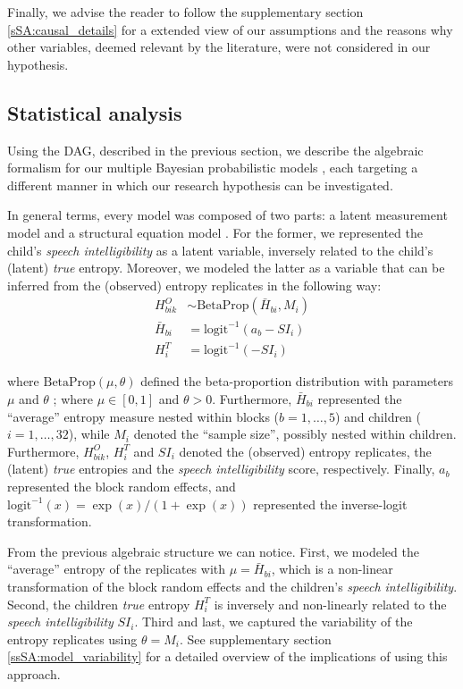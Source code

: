 Finally, we advise the reader to follow the supplementary section \ref{sSA:causal_details} for a extended view of our assumptions and the reasons why other variables, deemed relevant by the literature, were not considered in our hypothesis.
%
%
\subsection{Statistical analysis} \label{sS:stat_analysis}
%
Using the DAG, described in the previous section, we describe the algebraic formalism for our multiple Bayesian probabilistic models \cite{Jaynes_2003}, each targeting a different manner in which our research hypothesis can be investigated.

In general terms, every model was composed of two parts: a latent measurement model \cite{Everitt_1984} and a structural equation model \cite{Hoyle_et_al_2014}. For the former, we represented the child's \textit{speech intelligibility} as a latent variable, inversely related to the child's (latent) \textit{true} entropy. Moreover, we modeled the latter as a variable that can be inferred from the (observed) entropy replicates in the following way:
%
\begin{align}
	H^{O}_{bik} & \sim \text{BetaProp} \left( \bar{H}_{bi}, M_{i} \right) \\ 
	\bar{H}_{bi} &= \text{logit}^{-1}( a_{b} -SI_{i} ) \\
	H^{T}_{i} &= \text{logit}^{-1}( -SI_{i} )
\end{align} 

\noindent where $\text{BetaProp}(\mu, \theta)$ defined the beta-proportion distribution with parameters $\mu$ and $\theta$ \cite{Figueroa-Zuniga_et_al_2013, Kruschke_2015}; where $\mu \in [0,1]$ and $\theta>0$. Furthermore, $\bar{H}_{bi}$ represented the ``average'' entropy measure nested within blocks ($b=1,\dots,5$) and children ($i=1,\dots,32$), while $M_{i}$ denoted the ``sample size'', possibly nested within children. Furthermore, $H^{O}_{bik}$, $H^{T}_{i}$ and $SI_{i}$ denoted the (observed) entropy replicates, the (latent) \textit{true} entropies and the \textit{speech intelligibility} score, respectively. Finally, $a_{b}$ represented the block random effects, and $\text{logit}^{-1}(x) = \exp(x) / ( 1 + \exp(x) )$ represented the inverse-logit transformation. 

From the previous algebraic structure we can notice. First, we modeled the ``average'' entropy of the replicates with $\mu = \bar{H}_{bi}$, which is a non-linear transformation of the block random effects and the children's \textit{speech intelligibility}. Second, the children \textit{true} entropy $H^{T}_{i}$ is inversely and non-linearly related to the \textit{speech intelligibility} $SI_{i}$. Third and last, we captured the variability of the entropy replicates using $\theta = M_{i}$. See supplementary section \ref{ssSA:model_variability} for a detailed overview of the implications of using this approach.

